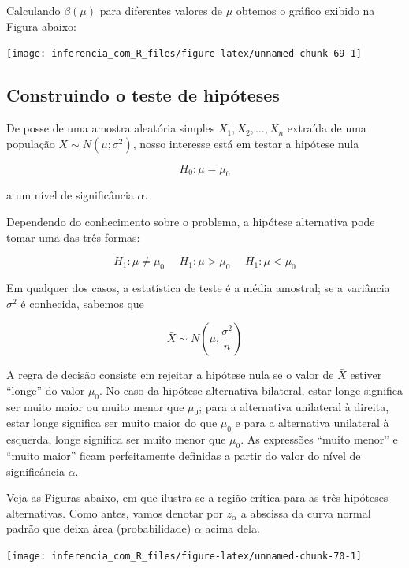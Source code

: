 \documentclass[
]{book}
\begin{document}
Calculando \(\beta(\mu)\) para diferentes valores de \(\mu\) obtemos o gráfico exibido na Figura abaixo:

\begin{center}\texttt{[image: inferencia\_com\_R\_files/figure-latex/unnamed-chunk-69-1]} \end{center}

\hypertarget{construindo-o-teste-de-hipuxf3teses}{%
\subsection{Construindo o teste de hipóteses}\label{construindo-o-teste-de-hipuxf3teses}}

De posse de uma amostra aleatória simples \(X_1, X_2, \ldots, X_n\) extraída de uma população \(X\sim N(\mu; \sigma^2)\), nosso interesse está em testar a hipótese nula

\[H_0: \mu = \mu_0\]

a um nível de significância \(\alpha\).

Dependendo do conhecimento sobre o problema, a hipótese alternativa pode tomar uma das três formas:

\[H_1:\mu\neq\mu_0~~~~~~H_1:\mu>\mu_0~~~~~~H_1:\mu<\mu_0\]

Em qualquer dos casos, a estatística de teste é a média amostral; se a variância \(\sigma^2\) é conhecida, sabemos que

\[\bar X \sim N\left(\mu,\frac{\sigma^2}{n}\right)\]

A regra de decisão consiste em rejeitar a hipótese nula se o valor de \(\bar X\) estiver ``longe'' do valor \(\mu_0\). No caso da hipótese alternativa bilateral, estar longe significa ser muito maior ou muito menor que \(\mu_0\); para a alternativa unilateral à direita, estar longe significa ser muito maior do que \(\mu_0\) e para a alternativa unilateral à esquerda, longe significa ser muito menor que \(\mu_0\). As expressões ``muito menor'' e ``muito maior'' ficam perfeitamente definidas a partir do valor do nível de significância \(\alpha\).

Veja as Figuras abaixo, em que ilustra-se a região crítica para as três hipóteses alternativas. Como antes, vamos denotar por \(z_\alpha\) a abscissa da curva normal padrão que deixa área (probabilidade) \(\alpha\) acima dela.

\begin{center}\texttt{[image: inferencia\_com\_R\_files/figure-latex/unnamed-chunk-70-1]} \end{center}
\end{document}
